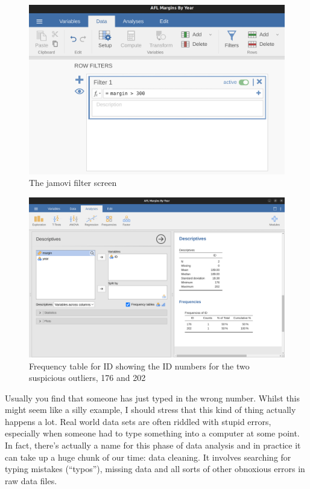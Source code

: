 \documentclass[
  a4paper,
]{book}
\begin{document}
\begin{figure}

\includegraphics[width=1\textwidth,height=\textheight]{images/fig5-9.png} \hfill{}

\caption{\label{fig-fig5-9}The jamovi filter screen}

\end{figure}

\begin{figure}

\includegraphics[width=1\textwidth,height=\textheight]{images/fig5-10.png} \hfill{}

\caption{\label{fig-fig5-10}Frequency table for ID showing the ID
numbers for the two suspicious outliers, 176 and 202}

\end{figure}

Usually you find that someone has just typed in the wrong number. Whilst
this might seem like a silly example, I should stress that this kind of
thing actually happens a lot. Real world data sets are often riddled
with stupid errors, especially when someone had to type something into a
computer at some point. In fact, there's actually a name for this phase
of data analysis and in practice it can take up a huge chunk of our
time: data cleaning. It involves searching for typing mistakes
(``typos''), missing data and all sorts of other obnoxious errors in raw
data files.
\end{document}
